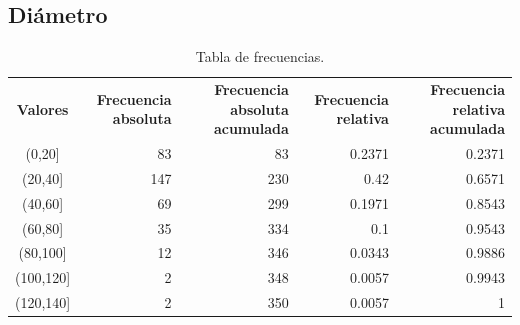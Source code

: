 \documentclass[11pt]{article}
\begin{document}

\newpage
\subsection{Diámetro}

\begin{table}[h!]
  \begin{center}
    \begin{tabular}{| c | r | r | r | r |}
      \hline
      \multirow{3}{*}{\textbf{Valores}} & 
      \multirow{3}{3cm}{\centering\textbf{Frecuencia absoluta}} & 
      \multirow{3}{3cm}{\centering\textbf{Frecuencia absoluta acumulada}} &
      \multirow{3}{3cm}{\centering\textbf{Frecuencia relativa}} & 
      \multirow{3}{3cm}{\centering\textbf{Frecuencia relativa acumulada}} \\
      & & & & \\
      & & & & \\ \hline
      (0,20] & 83 & 83 & 0.2371 & 0.2371 \\ \hline
      (20,40] & 147 & 230 & 0.42 & 0.6571 \\ \hline
      (40,60] & 69 & 299 & 0.1971 & 0.8543 \\ \hline
      (60,80] & 35 & 334 & 0.1 & 0.9543 \\ \hline
      (80,100] & 12 & 346 & 0.0343 & 0.9886 \\ \hline
      (100,120] & 2 & 348 & 0.0057 & 0.9943 \\ \hline
      (120,140] & 2 & 350 & 0.0057 & 1 \\ \hline
    \end{tabular}
    \caption{Tabla de frecuencias.}
    \label{tab:tablaDiametro}
  \end{center}
\end{table}
\end{document}
